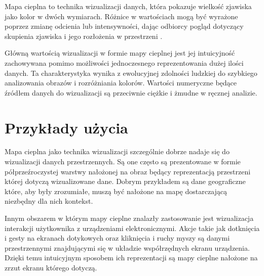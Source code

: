Mapa cieplna to technika wizualizacji danych, która pokazuje wielkość zjawiska jako kolor w dwóch wymiarach. Różnice w wartościach mogą być wyrażone poprzez zmianę odcienia lub intensywności, dając odbiorcy pogląd dotyczący skupienia zjawiska i jego rozłożenia w przestrzeni \cite{Heat_map_definition}.

Główną wartością wizualizacji w formie mapy cieplnej jest jej intuicyjność zachowywana pomimo możliwości jednoczesnego reprezentowania dużej ilości danych. Ta charakterystyka wynika z ewolucyjnej zdolności ludzkiej do szybkiego analizowania obrazów i rozróżniania kolorów. Wartości numeryczne będące źródłem danych do wizualizacji są przeciwnie ciężkie i żmudne w ręcznej analizie.

\section{Przykłady użycia}
Mapa cieplna jako technika wizualizacji szczególnie dobrze nadaje się do wizualizacji danych przestrzennych. Są one często są prezentowane w formie półprzeźroczystej warstwy nałożonej na obraz będący reprezentacją przestrzeni której dotyczą wizualizowane dane. Dobrym przykładem są dane geograficzne które, aby były zrozumiałe, muszą być nałożone na mapę dostarczającą niezbędny dla nich kontekst.


Innym obszarem w którym mapy cieplne znalazły zastosowanie jest wizualizacja interakcji użytkownika z urządzeniami elektronicznymi. Akcje takie jak dotknięcia i gesty na ekranach dotykowych oraz kliknięcia i ruchy myszy są danymi przestrzennymi znajdującymi się w układzie współrzędnych ekranu urządzenia. Dzięki temu intuicyjnym  sposobem ich reprezentacji są mapy cieplne nałożone na zrzut ekranu którego dotyczą.


